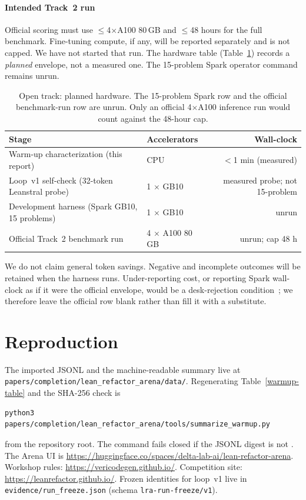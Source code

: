 \documentclass{article}
\begin{document}
\paragraph{Intended Track~2 run} Official scoring must use $\le$4$\times$A100 80\,GB and $\le$48 hours for the full benchmark. Fine-tuning compute, if any, will be reported separately and is not capped. We have not started that run. The hardware table (Table~\ref{hardware-table}) records a \emph{planned} envelope, not a measured one. The 15-problem Spark operator command remains unrun.

\begin{table}[!ht]
  \caption{Open track: planned hardware. The 15-problem Spark row and the official benchmark-run row are unrun. Only an official 4$\times$A100 inference run would count against the 48-hour cap.}
  \label{hardware-table}
  \centering
  \begin{tabular}{llr}
    \toprule
    Stage & Accelerators & Wall-clock \\
    \midrule
    Warm-up characterization (this report) & CPU & $<$1 min (measured) \\
    Loop~v1 self-check (32-token Leanstral probe) & 1 $\times$ GB10 & measured probe; not 15-problem \\
    Development harness (Spark GB10, 15 problems) & 1 $\times$ GB10 & unrun \\
    Official Track~2 benchmark run & 4 $\times$ A100 80\,GB & unrun; cap 48 h \\
    \bottomrule
  \end{tabular}
\end{table}

We do not claim general token savings. Negative and incomplete outcomes will be retained when the harness runs. Under-reporting cost, or reporting Spark wall-clock as if it were the official envelope, would be a desk-rejection condition~\cite{vericodegen2026}; we therefore leave the official row blank rather than fill it with a substitute.

\section{Reproduction}

The imported JSONL and the machine-readable summary live at
\texttt{papers/completion/lean\_refactor\_arena/data/}.
Regenerating Table~\ref{warmup-table} and the SHA-256 check is
\begin{verbatim}
python3 papers/completion/lean_refactor_arena/tools/summarize_warmup.py
\end{verbatim}
from the repository root. The command fails closed if the JSONL digest is not
.
The Arena UI is \url{https://huggingface.co/spaces/delta-lab-ai/lean-refactor-arena}.
Workshop rules: \url{https://vericodegen.github.io/}.
Competition site: \url{https://leanrefactor.github.io/}.
Frozen identities for loop~v1 live in \texttt{evidence/run\_freeze.json} (schema \texttt{lra-run-freeze/v1}).
\end{document}
